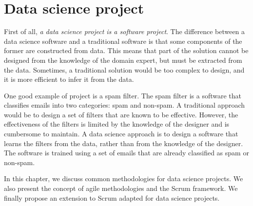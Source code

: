 \chapter{Data science project}
\label{chap:project}



First of all, \emph{a data science project is a software project}.  The difference between a data
science software and a traditional software is that some components of the former are
constructed from data.  This means that part of the solution cannot be designed from the
knowledge of the domain expert, but must be extracted from the data.  Sometimes, a
traditional solution would be too complex to design, and it is more efficient to infer it
from the data.

One good example of project is a spam filter.  The spam filter is a software that
classifies emails into two categories: spam and non-spam.  A traditional approach would be
to design a set of filters that are known to be effective.  However, the effectiveness of
the filters is limited by the knowledge of the designer and is cumbersome to maintain.  A
data science approach is to design a software that learns the filters from the data,
rather than from the knowledge of the designer.  The software is trained using a set of
emails that are already classified as spam or non-spam.

In this chapter, we discuss common methodologies for data science projects.  We also
present the concept of agile methodologies and the Scrum framework.  We finally propose an
extension to Scrum adapted for data science projects.

